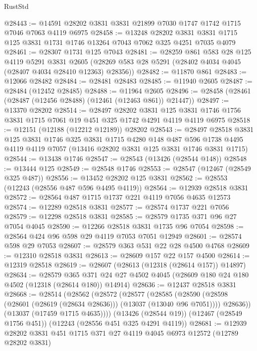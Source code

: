 \begin{lexlean}{RustStd}
\begin{coremodule}
@28443 := @14591 @28202 @3831 @3831 @21899 @7030 @1747 @1742 @1715 @7046 @7063 @4119 @6975
@28458 := @13248
    @28202
    @3831
    @3831
    @1715
    @125
    @3831
    @1731
    @1746
    @13264
    @7043
    @7062
    @325
    @4251
    @7035
    @4079
@28461 := @28307 @1731 @125 @7043
@28481 := @28259
    @861
    @583
    @28
    @125
    @4119
    @5291
    @3831
    @2605
    (@28269 @583 @28 @5291 (@28402 @4034 @4045 (@28407 @4034 @28410 @12363) @28356))
@28482 := @11870 @861
@28483 := @12066 @28482
@28484 := @28481 @28483
@28485 := @11940 @2605
@28487 := @28484 (@12452 @28485)
@28488 := @11964 @2605
@28496 := @28458 (@28461 (@28487 (@12456 @28488) (@12461 (@12463 @861)) @21447))
@28497 := @13370 @28202
@28514 := @28497
    @28202
    @3831
    @125
    @3831
    @1746
    @1756
    @3831
    @1715
    @7061
    @19
    @451
    @325
    @1742
    @4291
    @4119
    @4119
    @6975
@28518 := @12151 (@12188 (@12212 @12189)) @28202
@28543 := @28497
    @28518
    @3831
    @125
    @3831
    @1746
    @325
    @3831
    @1715
    @4280
    @148
    @487
    @596
    @1738
    @4495
    @4119
    @4119
    @7057
    (@13416 @28202 @3831 @125 @3831 @1746 @3831 @1715)
@28544 := @13438 @1746
@28547 := @28543 (@13426 (@28544 @148))
@28548 := @13444 @125
@28549 := @28548 @1746
@28553 := @28547 (@12467 (@28549 @325 @487))
@28556 := @13452 @28202 @125 @3831
@28562 := @28553 (@12243 (@28556 @487 @596 @4495 @4119))
@28564 := @12939 @28518 @3831
@28572 := @28564 @487 @1715 @1737 @221 @4119 @7056 @4635 @12573
@28574 := @12289 @28518 @3831
@28577 := @28574 @1737 @221 @7056
@28579 := @12298 @28518 @3831
@28585 := @28579 @1735 @371 @96 @27 @7054 @4045
@28590 := @12266 @28518 @3831 @1735 @96 @7054
@28598 := @28564 @424 @96 @598 @29 @4119 @7053 @7051 @12949
@28601 := @28574 @598 @29 @7053
@28607 := @28579 @363 @531 @22 @28 @4500 @4768
@28609 := @12310 @28518 @3831
@28613 := @28609 @157 @22 @157 @4500
@28614 := @12319 @28518
@28619 := @28607 (@28613 (@12318 (@28614 @157)) @14897)
@28634 := @28579
    @365
    @371
    @24
    @27
    @4502
    @4045
    (@28609 @180 @24 @180 @4502 (@12318 (@28614 @180)) @14914)
@28636 := @12437 @28518 @3831
@28668 := @28514
    (@28562
      (@28572
        (@28577
          (@28585
            (@28590 (@28598 (@28601 (@28619 (@28634 @28636))) (@13037 (@13040 @96 @7051))))
            @28636))
        (@13037 (@17459 @1715 @4635))))
    (@13426 (@28544 @19))
    (@12467 (@28549 @1756 @451))
    (@12243 (@28556 @451 @325 @4291 @4119))
@28681 := @12939 @28202 @3831 @451 @1715 @371 @27 @4119 @4045 @6973 @12572 (@12789 @28202 @3831)

\end{coremodule}
\end{lexlean}
